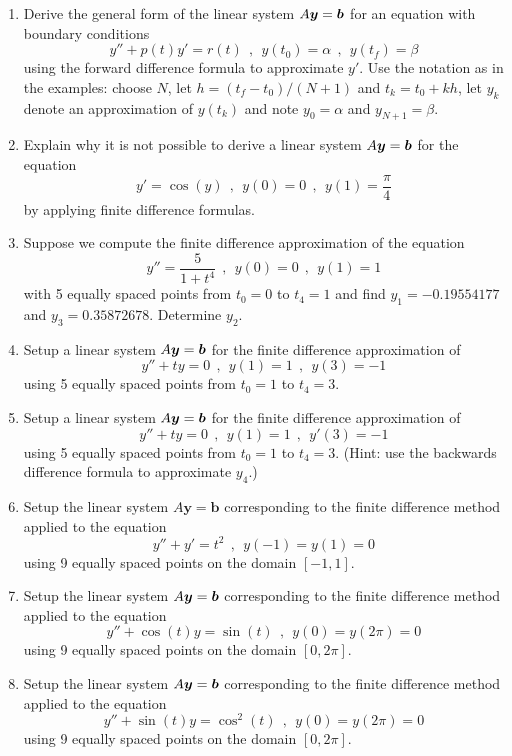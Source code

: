 \begin{enumerate}[leftmargin=*]
\item Derive the general form of the linear system $A \boldsymbol{y} = \boldsymbol{b}$ for an equation with boundary conditions
$$
y'' + p(t)y' = r(t) \ \ , \ \ y(t_0) = \alpha \ \ , \ \ y(t_f) = \beta
$$
using the forward difference formula to approximate $y'$. Use the notation as in the examples: choose $N$, let  $h = (t_f - t_0)/(N+1)$ and $t_k = t_0 + kh$, let $y_k$ denote an approximation of $y(t_k)$ and note $y_0 = \alpha$ and $y_{N+1} = \beta$.

\item Explain why it is not possible to derive a linear system $A \boldsymbol{y} = \boldsymbol{b}$ for the equation
$$
y' = \cos(y) \ \ , \ \ y(0) = 0 \ \ , \ \ y(1) = \frac{\pi}{4}
$$
by applying finite difference formulas.

\item Suppose we compute the finite difference approximation of the equation
$$
y'' = \frac{5}{1 + t^4} \ \ , \ \ y(0) = 0 \ \ , \ \ y(1) = 1
$$
with 5 equally spaced points from $t_0 = 0$ to $t_4 = 1$ and find $y_1 = -0.19554177$ and $y_3 = 0.35872678$. Determine $y_2$.

\item Setup a linear system $A \boldsymbol{y} = \boldsymbol{b}$ for the finite difference approximation of
$$
y'' + ty = 0 \ \ , \ \ y(1) = 1 \ \ , \ \ y(3) = -1
$$
using 5 equally spaced points from $t_0 = 1$ to $t_4 = 3$.

\item Setup a linear system $A \boldsymbol{y} = \boldsymbol{b}$ for the finite difference approximation of
$$
y'' + ty = 0 \ \ , \ \ y(1) = 1 \ \ , \ \ y'(3) = -1
$$
using 5 equally spaced points from $t_0 = 1$ to $t_4 = 3$. (Hint: use the backwards difference formula to approximate $y_4$.)

\item Setup the linear system $A \boldsymbol{y} = \boldsymbol{b}$ corresponding to the finite difference method applied to the equation
$$
y'' + y' = t^2 \ \ , \ \ y(-1) = y(1) = 0
$$
using 9 equally spaced points on the domain $[-1,1]$.

\item Setup the linear system $A\boldsymbol{y} = \boldsymbol{b}$ corresponding to the finite difference method applied to the equation
$$
y'' + \cos(t) y = \sin(t) \ \ , \ \ y(0) = y(2\pi) = 0
$$
using 9 equally spaced points on the domain $[0,2\pi]$.

\item Setup the linear system $A\boldsymbol{y} = \boldsymbol{b}$ corresponding to the finite difference method applied to the equation
$$
y'' + \sin(t) y = \cos^2(t) \ \ , \ \ y(0) = y(2\pi) = 0
$$
using 9 equally spaced points on the domain $[0,2\pi]$.

\end{enumerate}